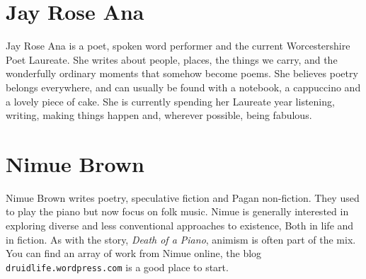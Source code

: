 \contributors

\section*{Jay Rose Ana}%

Jay Rose Ana is a poet, spoken word performer and the current
Worcestershire Poet Laureate. She writes about people, places, the
things we carry, and the wonderfully ordinary moments that somehow
become poems. She believes poetry belongs everywhere, and can usually
be found with a notebook, a cappuccino and a lovely piece of cake. She
is currently spending her Laureate year listening, writing, making
things happen and, wherever possible, being fabulous.

\section*{Nimue Brown}%

Nimue Brown writes poetry, speculative fiction and Pagan
non-fiction. They used to play the piano but now focus on folk
music. Nimue is generally interested in exploring diverse and less
conventional approaches to existence, Both in life and in fiction. As
with the story, 
\textit{Death of a Piano},
animism is often part of the mix. You can find an
array of work from Nimue online, the blog
\texttt{druidlife.wordpress.com} is a good place to start.

% 
% 
% 
% 

